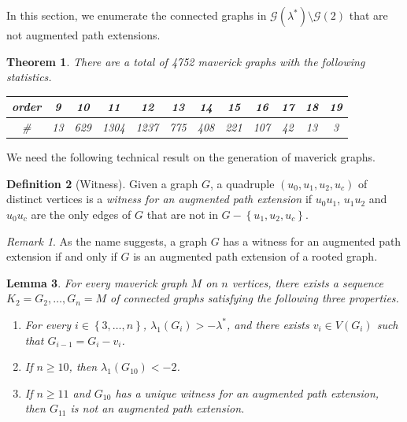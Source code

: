 \documentclass[11pt]{article}
\newtheorem{theorem}{Theorem}[section]
\newtheorem{lemma}[theorem]{Lemma}
\theoremstyle{definition}
\newtheorem{definition}[theorem]{Definition}
\theoremstyle{remark}
\newtheorem*{remark}{Remark}
\newcommand{\sset}[1]{\left\{{#1}\right\}}
\newcommand{\la}{\lambda}
\newcommand{\las}{\lambda^*}
\newcommand{\G}{\mathcal{G}}
\begin{document}
In this section, we enumerate the connected graphs in $\G(\las)\setminus\G(2)$ that are not augmented path extensions.

\begin{theorem} \label{thm:main3}
    There are a total of 4752 maverick graphs with the following statistics.
    \begin{center}
        \begin{tabular}{cccccccccccc}
            order & 9 & 10 & 11 & 12 & 13 & 14 & 15 & 16 & 17 & 18 & 19 \\
            \hline
            \# & 13 & 629 & 1304 & 1237 & 775 & 408 & 221 & 107 & 42 & 13 & 3
        \end{tabular}
    \end{center}
\end{theorem}

We need the following technical result on the generation of maverick graphs.

\begin{definition}[Witness]
    Given a graph $G$, a quadruple $(u_0,u_1,u_2,u_c)$ of distinct vertices is a \emph{witness for an augmented path extension} if $u_0u_1$, $u_1u_2$ and $u_0u_c$ are the only edges of $G$ that are not in $G - \sset{u_1,u_2,u_c}$.
\end{definition}

\begin{remark}
    As the name suggests, a graph $G$ has a witness for an augmented path extension if and only if $G$ is an augmented path extension of a rooted graph.
\end{remark}

\begin{lemma} \label{lem:gen-mav}
    For every maverick graph $M$ on $n$ vertices, there exists a sequence $K_2 = G_2, \dots, G_n = M$ of connected graphs satisfying the following three properties.
    \begin{enumerate}[label=(\roman*)]
        \item For every $i \in \sset{3,\dots,n}$, $\la_1(G_i) > -\las$, and there exists $v_i \in V(G_i)$ such that $G_{i-1} = G_i - v_i$.
        \item If $n \ge 10$, then $\la_1(G_{10}) < -2$. \label{item:res-1}
        \item If $n \ge 11$ and $G_{10}$ has a unique witness for an augmented path extension, then $G_{11}$ is not an augmented path extension. \label{item:res-2}
    \end{enumerate}
\end{lemma}
\end{document}
